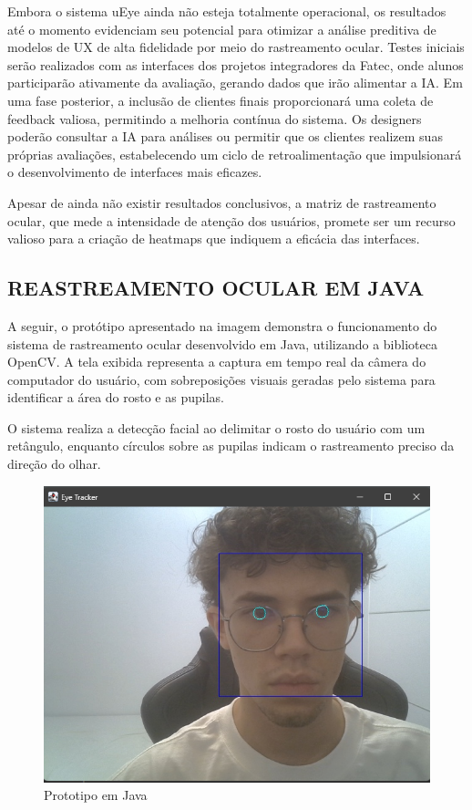Embora o sistema uEye ainda não esteja totalmente operacional, os resultados até o momento evidenciam seu potencial para otimizar a análise preditiva de modelos de UX de alta fidelidade por meio do rastreamento ocular. Testes iniciais serão realizados com as interfaces dos projetos integradores da Fatec, onde alunos participarão ativamente da avaliação, gerando dados que irão alimentar a IA. Em uma fase posterior, a inclusão de clientes finais proporcionará uma coleta de feedback valiosa, permitindo a melhoria contínua do sistema. Os designers poderão consultar a IA para análises ou permitir que os clientes realizem suas próprias avaliações, estabelecendo um ciclo de retroalimentação que impulsionará o desenvolvimento de interfaces mais eficazes.

Apesar de ainda não existir resultados conclusivos, a matriz de rastreamento ocular, que mede a intensidade de atenção dos usuários, promete ser um recurso valioso para a criação de heatmaps que indiquem a eficácia das interfaces.\newline

\subsection*{REASTREAMENTO OCULAR EM JAVA}
A seguir, o protótipo apresentado na imagem demonstra o funcionamento do sistema de rastreamento ocular desenvolvido em Java, utilizando a biblioteca OpenCV. A tela exibida representa a captura em tempo real da câmera do computador do usuário, com sobreposições visuais geradas pelo sistema para identificar a área do rosto e as pupilas.

O sistema realiza a detecção facial ao delimitar o rosto do usuário com um retângulo, enquanto círculos sobre as pupilas indicam o rastreamento preciso da direção do olhar.

\begin{figure}[H]
    \centering
    \caption{Prototipo em Java}%
    \label{fig:pg-telaJava1}
    \includegraphics[width=0.72\linewidth]{Illustrations/java1.png}
\end{figure}

